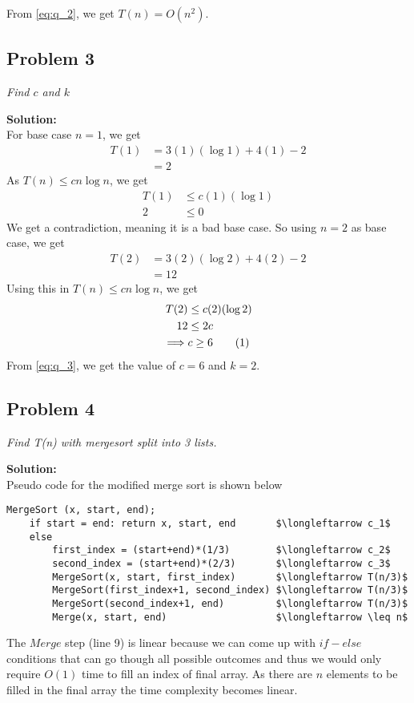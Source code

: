 \documentclass[12pt,a4paper]{article}
\newcommand\numberthis{\addtocounter{equation}{1}\tag{\theequation}}
\newcommand{\solution}{\noindent\textbf{Solution:}\\}
\begin{document}
From \eqref{eq:q_2}, we get $T(n) = O(n^2)$.

\newpage
\subsection*{Problem 3}
\textit{
    Find $c$ and $k$
}

\solution
For base case $n=1$, we get
\begin{align*}
    T(1) &= 3(1)(\log1) + 4(1) - 2 \\
         &= 2
\end{align*}
As $T(n) \leq cn\log n$, we get
\begin{align*}
    T(1) &\leq c(1)(\log1) \\
    2 & \leq 0
\end{align*}
We get a contradiction, meaning it is a bad base case. So using $n=2$ as base case, we get
\begin{align*}
    T(2) &= 3(2)(\log2) + 4(2) - 2 \\
         &= 12
\end{align*}
Using this in $T(n) \leq cn\log n$, we get
\begin{align*}
    T(2) &\leq c(2)(\log2) \\
    12 &\leq 2c \\
    \implies & c \geq 6 \numberthis \label{eq:q_3}
\end{align*}
From \eqref{eq:q_3}, we get the value of $c = 6$ and $k = 2$.

\newpage
\subsection*{Problem 4}
\textit{
    Find T(n) with mergesort split into 3 lists.
}

\solution
Pseudo code for the modified merge sort is shown below
\begin{lstlisting}[mathescape=true]
MergeSort (x, start, end);
    if start = end: return x, start, end       $\longleftarrow c_1$
    else
        first_index = (start+end)*(1/3)        $\longleftarrow c_2$
        second_index = (start+end)*(2/3)       $\longleftarrow c_3$
        MergeSort(x, start, first_index)       $\longleftarrow T(n/3)$
        MergeSort(first_index+1, second_index) $\longleftarrow T(n/3)$
        MergeSort(second_index+1, end)         $\longleftarrow T(n/3)$
        Merge(x, start, end)                   $\longleftarrow \leq n$
\end{lstlisting}

The $Merge$ step (line 9) is linear because we can come up with $if-else$ conditions that can go though all possible outcomes and thus we would only require $O(1)$ time to fill an index of final array. As there are $n$ elements to be filled in the final array the time complexity becomes linear.
\end{document}
